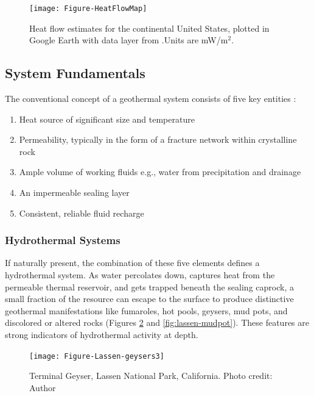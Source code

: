 \begin{figure}
\centering
\texttt{[image: Figure-HeatFlowMap]}
\caption[Heat flow across the continental U.S.]{Heat flow estimates for the continental United States, plotted in Google Earth with data layer from \protect\citep{lucazeau_analysis_2019}.Units are mW/m$^2$.}
\label{fig:heatflow}
\end{figure}

\subsection{System Fundamentals}\label{ch2:sysfund}

The conventional concept of a geothermal system consists of five key entities \citep[p.\ 9]{dipippo_geothermal_2012}:
\begin{enumerate}[itemsep=2pt] \label{list:sysreq}
   \renewcommand{\labelenumi}{\roman{enumi}}
   \item Heat source of significant size and temperature
   \item Permeability, typically in the form of a fracture network within crystalline rock
   \item Ample volume of working fluids e.g., water from precipitation and drainage
   \item An impermeable sealing layer
   \item Consistent, reliable fluid recharge
\end{enumerate}

\subsubsection{Hydrothermal Systems}\label{ch2:hydro}

If naturally present, the combination of these five elements defines a hydrothermal system. As water percolates down, captures heat from the permeable thermal reservoir, and gets trapped beneath the sealing caprock, a small fraction of the resource can escape to the surface to produce distinctive geothermal manifestations like fumaroles, hot pools, geysers, mud pots, and discolored or altered rocks (Figures \ref{fig:lassen-geysers} and \ref{fig:lassen-mudpot}). These features are strong indicators of hydrothermal activity at depth.

\begin{figure}
\centering
\texttt{[image: Figure-Lassen-geysers3]}
\caption[Terminal Geyser, Lassen National Park]{Terminal Geyser, Lassen National Park, California. Photo credit: Author}
\label{fig:lassen-geysers}
\end{figure}

